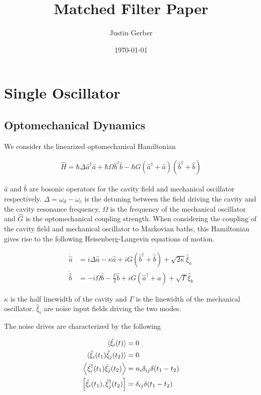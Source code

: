 \documentclass[12pt]{article}
\newcommand{\nn}{\nonumber}
\begin{document}
\title{Matched Filter Paper}
\author{Justin Gerber}
\date{\today}
\maketitle

\section{Single Oscillator}
\subsection{Optomechanical Dynamics}
We consider the linearized optomechanical Hamiltonian

\begin{align}
\hat{H} = \hbar \Delta \hat{a}^{\dag}\hat{a} + \hbar \Omega \hat{b}^{\dag}\hat{b} - \hbar G \left(\hat{a}^{\dag} + \hat{a}\right)\left(\hat{b}^{\dag} + \hat{b}\right)
\end{align}

$\hat{a}$ and $\hat{b}$ are bosonic operators for the cavity field and mechanical oscillator respectively. $\Delta = \omega_d - \omega_c$ is the detuning between the field driving the cavity and the cavity resonance frequency, $\Omega$ is the frequency of the mechanical oscillator and $\hat{G}$ is the optomechanical coupling strength. When considering the coupling of the cavity field and mechanical oscillator to Markovian baths, this Hamiltonian gives rise to the following Heisenberg-Langevin equations of motion.

\begin{align}
\dot{\hat{a}} &= i \Delta \hat{a} - \kappa \hat{a} + iG\left(\hat{b}^{\dag} + \hat{b}\right)+ \sqrt{2\kappa} \hat{\xi}_a\\
\dot{\hat{b}} &= -i \Omega \hat{b} - \frac{\Gamma}{2} \hat{b} + iG \left(\hat{a}^{\dag}+\hat{a}\right)+ \sqrt{\Gamma} \hat{\xi}_b \nonumber
\end{align}

$\kappa$ is the half linewidth of the cavity and $\Gamma$ is the linewidth of the mechanical oscillator. $\hat{\xi}_i$ are noise input fields driving the two modes. 

The noise drives are characterized by the following

\begin{align}
\braket{\hat{\xi}_i(t)} &= 0\\
\braket{\hat{\xi}_i(t_1) \hat{\xi}_j(t_2)} &= 0 \nn\\
\Braket{\hat{\xi}^{\dag}_i(t_1) \hat{\xi}_j(t_2)} &= n_i \delta_{ij} \delta(t_1-t_2) \nn\\
\left[\hat{\xi}_i(t_1),\hat{\xi}^{\dag}_j(t_2) \right] &= \delta_{ij} \delta(t_1-t_2) \nn
\end{align}
\end{document}
